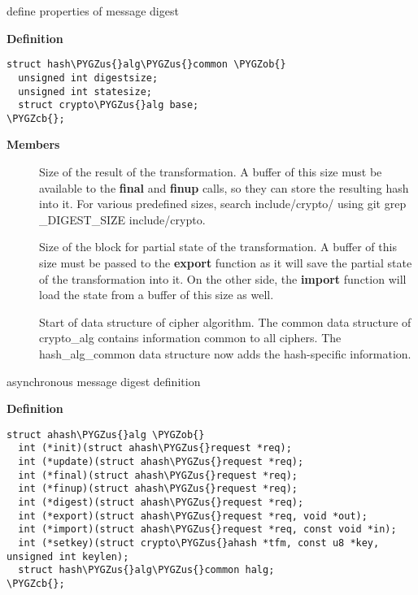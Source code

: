 \documentclass[a4paper,8pt,english]{sphinxmanual}
\def\PYGZus{\char`\_}
\def\PYGZob{\char`\{}
\def\PYGZcb{\char`\}}
\begin{document}
\begin{fulllineitems}
\label{crypto/api-digest:c.hash_alg_common}
define properties of message digest

\end{fulllineitems}


\textbf{Definition}

\begin{Verbatim}[commandchars=\\\{\}]
struct hash\PYGZus{}alg\PYGZus{}common \PYGZob{}
  unsigned int digestsize;
  unsigned int statesize;
  struct crypto\PYGZus{}alg base;
\PYGZcb{};
\end{Verbatim}

\textbf{Members}
\begin{description}
\item[{}] \leavevmode
Size of the result of the transformation. A buffer of this size
must be available to the \textbf{final} and \textbf{finup} calls, so they can
store the resulting hash into it. For various predefined sizes,
search include/crypto/ using
git grep \_DIGEST\_SIZE include/crypto.

\item[{}] \leavevmode
Size of the block for partial state of the transformation. A
buffer of this size must be passed to the \textbf{export} function as it
will save the partial state of the transformation into it. On the
other side, the \textbf{import} function will load the state from a
buffer of this size as well.

\item[{}] \leavevmode
Start of data structure of cipher algorithm. The common data
structure of crypto\_alg contains information common to all ciphers.
The hash\_alg\_common data structure now adds the hash-specific
information.

\end{description}

\begin{fulllineitems}
\label{crypto/api-digest:c.ahash_alg}
asynchronous message digest definition

\end{fulllineitems}


\textbf{Definition}

\begin{Verbatim}[commandchars=\\\{\}]
struct ahash\PYGZus{}alg \PYGZob{}
  int (*init)(struct ahash\PYGZus{}request *req);
  int (*update)(struct ahash\PYGZus{}request *req);
  int (*final)(struct ahash\PYGZus{}request *req);
  int (*finup)(struct ahash\PYGZus{}request *req);
  int (*digest)(struct ahash\PYGZus{}request *req);
  int (*export)(struct ahash\PYGZus{}request *req, void *out);
  int (*import)(struct ahash\PYGZus{}request *req, const void *in);
  int (*setkey)(struct crypto\PYGZus{}ahash *tfm, const u8 *key, unsigned int keylen);
  struct hash\PYGZus{}alg\PYGZus{}common halg;
\PYGZcb{};
\end{Verbatim}
\end{document}

